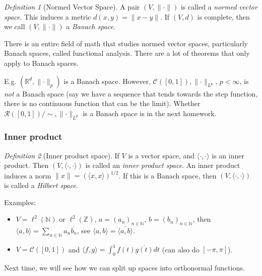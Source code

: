 \documentclass{article}
\theoremstyle{plain}
\theoremstyle{remark}
\newtheorem{definition}{Definition}
\newcommand{\N}{{\mathbb N}}
\newcommand{\Z}{{\mathbb Z}}
\newcommand{\R}{{\mathbb R}}
\begin{document}
\begin{definition}[Normed Vector Space]
	A pair $(V,\lVert \cdot \rVert)$ is called a \emph{normed vector space}.
	This induces a metric $d(x,y) = \lVert x - y \rVert$.
	If $(V,d)$ is complete, then we call $(V,\lVert \cdot \rVert)$ a \emph{Banach space}.
\end{definition}
There is an entire field of math that studies normed vector spaces,
particularly Banach spaces, called functional analysis.
There are a lot of theorems that only apply to Banach spaces.

E.g. $(\R^d,\lVert \cdot \rVert_p)$ is a Banach space.
However, $\mathcal{C}([0,1]), \lVert \cdot \rVert_{L^p}$, $p < \infty$,
is \emph{not} a Banach space
(say we have a sequence that tends towards the step function,
there is no continuous function that can be the limit).
Whether $\mathcal{R}([0,1])/\sim, \lVert \cdot \rVert_{L^p}$ is a Banach space
is in the next homework.

\subsubsection{Inner product}
\begin{definition}[Inner product space]
	If $V$ is a vector space, and $\langle \cdot, \cdot \rangle$ is an inner product.
	Then $(V,\langle \cdot, \cdot \rangle)$ is called an \emph{inner product space}.
	An inner product induces a norm $\lVert x \rVert = \left( \langle x,x \rangle\right)^{1/2}$.
	If this is a Banach space, then $(V,\langle \cdot, \cdot \rangle)$ is
	called a \emph{Hilbert space}.
\end{definition}
Examples:
\begin{itemize}
	\item $V = \ell^2(\N)$ or $\ell^2(\Z)$, $a = (a_n)_{n \in \N}$,
		$b = (b_n)_{n \in \N}$,
		then $\langle a ,b \rangle = \sum_{n \in \N} a_n \overline{b_n}$,
		see $\langle a,b \rangle = \overline{\langle a, b \rangle}$.
	\item $V = \mathcal{C}([0,1])$ and $\langle f,g \rangle =
		\int_0^1 f(t)\overline{g(t)}dt$
		(can also do $[-\pi,\pi]$).
\end{itemize}
Next time, we will see how we can split up spaces into orthonormal functions.
\end{document}
